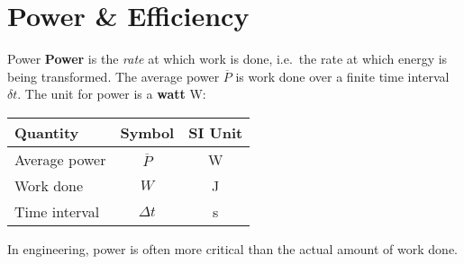 \documentclass[12pt,compress,aspectratio=169]{beamer}
\begin{document}


\section{Power \& Efficiency}

\begin{frame}{Power}
  \textbf{Power} is the \emph{rate} at which work is done, i.e.\ the rate at
  which energy is being transformed. The average power $\overline{P}$ is work
  done over a finite time interval $\delta t$. The unit for power is a
  \textbf{watt} \si{\watt}:

  \begin{center}
    \begin{tabular}{l|c|c}
      \rowcolor{pink}
      \textbf{Quantity}  & \textbf{Symbol} & \textbf{SI Unit} \\ \hline
      Average power  & $\overline{P}$ & \si{\watt} \\
      Work done      & $W$            & \si{\joule} \\
      Time interval  & $\Delta t$     & \si{\second}
    \end{tabular}
  \end{center}
  In engineering, power is often more critical than the actual amount of work
  done.
\end{frame}
\end{document}

